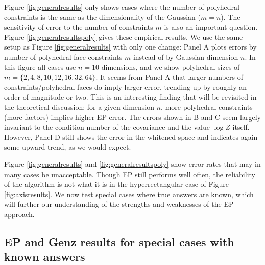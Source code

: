 \documentclass[twoside,11pt]{article}
\begin{document}
Figure \ref{fig:generalresults} only shows cases where the number of polyhedral constraints is the same as the dimensionality of the Gaussian ($m=n$).  The sensitivity of error to the number of constraints $m$ is also an important question.  Figure \ref{fig:generalresultspoly} gives these empirical results.  We use the same setup as Figure \ref{fig:generalresults} with only one change: Panel A plots errors by number of polyhedral face constraints $m$ instead of by Gaussian dimension $n$.  In this figure all cases use $n=10$ dimensions, and we show polyhedral sizes of $m = \{2,4,8,10,12,16,32,64\}$.  It seems from Panel A that larger numbers of constraints/polyhedral faces do imply larger error, trending up by roughly an order of magnitude or two.  This is an interesting finding that will be revisited in the theoretical discussion: for a given dimension $n$, more polyhedral constraints (more factors) implies higher EP error.  The errors shown in B and C seem largely invariant to the condition number of the covariance and the value $\log Z$ itself.  However, Panel D still shows the error in the whitened space and indicates again some upward trend, as we would expect.

Figure \ref{fig:generalresults} and \ref{fig:generalresultspoly} show error rates that may in many cases be unacceptable.  Though EP still performs well often, the reliability of the algorithm is not what it is in the hyperrectangular case of Figure \ref{fig:axisresults}.   We now test special cases where true answers are known, which will further our understanding of the strengths and weaknesses of the EP approach.

\subsection{EP and Genz results for special cases with known answers}
\label{sec:specialresults}
\end{document}
